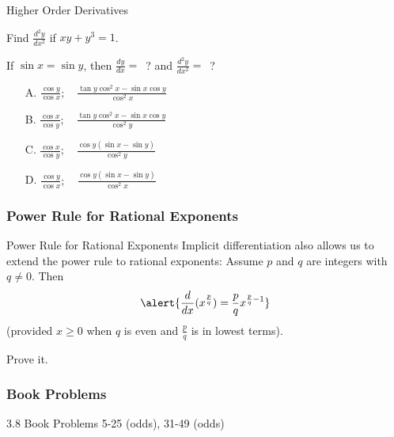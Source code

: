 \documentclass[cal1spr16Lectures.tex]{subfiles}
\begin{document}
\begin{frame}{\small Higher Order Derivatives}
\begin{ex} Find $\textstyle\frac{d^2 y}{dx^2}$ if $xy+y^3=1$. \end{ex}
\end{frame}

\begin{frame}
\begin{exe}
If $\sin x=\sin y$, then $\textstyle\frac{dy}{dx}=$\ ? and $\textstyle\frac{d^2y}{dx^2}=$\ ?
\begin{itemize}
\item[A. ]$\frac{\cos y}{\cos x};\quad \frac{\tan y\cos^2x-\sin x\cos y}{\cos^2x}$
\item[B. ]$\frac{\cos x}{\cos y};\quad \frac{\tan y\cos^2x-\sin x\cos y}{\cos^2y}$
\item[C. ]$\frac{\cos x}{\cos y};\quad \frac{\cos y(\sin x-\sin y)}{\cos^2 y}$
\item[D. ]$\frac{\cos y}{\cos x};\quad \frac{\cos y(\sin x-\sin y)}{\cos^2 x}$
\end{itemize}
\end{exe}
\end{frame}

\subsubsection{Power Rule for Rational Exponents}

\begin{frame}{\small Power Rule for Rational Exponents}
Implicit differentiation also allows us to extend the power rule to rational exponents:  Assume $p$ and $q$ are integers with $q \neq 0$.  Then 
\[\alert{\frac{d}{dx} (x^{\frac{p}{q}})=\frac{p}{q} x^{\frac{p}{q}-1}}\]
(provided $x \geq 0$ when $q$ is even and $\textstyle\frac{p}{q}$ is in lowest terms).
\begin{exe}Prove it. \end{exe}
\end{frame}

\subsubsection{Book Problems}

\begin{frame}
\begin{block}{3.8 Book Problems} 5-25 (odds), 31-49 (odds) \end{block} 
\end{frame}
\end{document}
